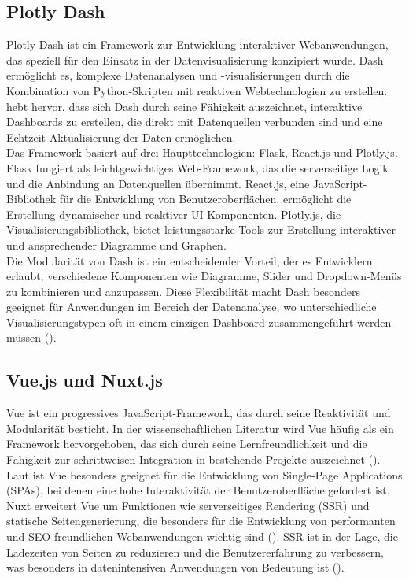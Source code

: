 \documentclass[a4paper, 12pt]{scrartcl}
\begin{document}
\subsection{Plotly Dash}
Plotly Dash ist ein Framework zur Entwicklung interaktiver Webanwendungen, das speziell für den Einsatz in der Datenvisualisierung konzipiert wurde. Dash ermöglicht es, komplexe Datenanalysen und -visualisierungen durch die Kombination von Python-Skripten mit reaktiven Webtechnologien zu erstellen. \textcite{Dabbas2021} hebt hervor, dass sich Dash durch seine Fähigkeit auszeichnet, interaktive Dashboards zu erstellen, die direkt mit Datenquellen verbunden sind und eine Echtzeit-Aktualisierung der Daten ermöglichen.\\[1em] Das Framework basiert auf drei Haupttechnologien: Flask, React.js und Plotly.js. Flask fungiert als leichtgewichtiges Web-Framework, das die serverseitige Logik und die Anbindung an Datenquellen übernimmt. React.js, eine JavaScript-Bibliothek für die Entwicklung von Benutzeroberflächen, ermöglicht die Erstellung dynamischer und reaktiver UI-Komponenten. Plotly.js, die Visualisierungsbibliothek, bietet leistungsstarke Tools zur Erstellung interaktiver und ansprechender Diagramme und Graphen.\\[1em] Die Modularität von Dash ist ein entscheidender Vorteil, der es Entwicklern erlaubt, verschiedene Komponenten wie Diagramme, Slider und Dropdown-Menüs zu kombinieren und anzupassen. Diese Flexibilität macht Dash besonders geeignet für Anwendungen im Bereich der Datenanalyse, wo unterschiedliche Visualisierungstypen oft in einem einzigen Dashboard zusammengeführt werden müssen (\cite{Dabbas2021}).

\subsection{Vue.js und Nuxt.js}
\ac{Vue} ist ein progressives JavaScript-Framework, das durch seine Reaktivität und Modularität besticht. In der wissenschaftlichen Literatur wird \ac{Vue} häufig als ein Framework hervorgehoben, das sich durch seine Lernfreundlichkeit und die Fähigkeit zur schrittweisen Integration in bestehende Projekte auszeichnet (\cite{Li2021}). Laut \textcite{Novac2021} ist \ac{Vue} besonders geeignet für die Entwicklung von Single-Page Applications (SPAs), bei denen eine hohe Interaktivität der Benutzeroberfläche gefordert ist.
\clearpage
\ac{Nuxt} erweitert \ac{Vue} um Funktionen wie serverseitiges Rendering (SSR) und statische Seitengenerierung, die besonders für die Entwicklung von performanten und SEO-freundlichen Webanwendungen wichtig sind (\cite{Gomes2023}). SSR ist in der Lage, die Ladezeiten von Seiten zu reduzieren und die Benutzererfahrung zu verbessern, was besonders in datenintensiven Anwendungen von Bedeutung ist (\cite{Sianandar2022}).
\end{document}
